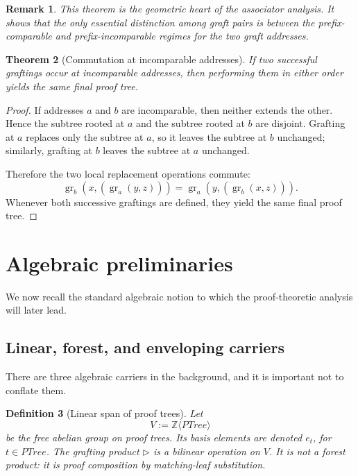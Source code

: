 \documentclass[11pt]{article}
\newtheorem{theorem}{Theorem}
\newtheorem{definition}[theorem]{Definition}
\newtheorem{remark}[theorem]{Remark}
\newcommand{\PTree}{\mathit{PTree}}
\newcommand{\ZZ}{\mathbb{Z}}
\newcommand{\graftat}[3]{\operatorname{gr}_{#2}(#3,#1)}
\begin{document}
\begin{remark}
This theorem is the geometric heart of the associator analysis. It shows that
the only essential distinction among graft pairs is between the
prefix-comparable and prefix-incomparable regimes for the two graft addresses.
\end{remark}

\begin{theorem}[Commutation at incomparable addresses]
If two successful graftings occur at incomparable addresses, then performing
them in either order yields the same final proof tree.
\end{theorem}

\begin{proof}
If addresses \(a\) and \(b\) are incomparable, then neither extends the
other. Hence the subtree rooted at \(a\) and the subtree rooted at \(b\) are
disjoint. Grafting at \(a\) replaces only the subtree at \(a\), so it leaves
the subtree at \(b\) unchanged; similarly, grafting at \(b\) leaves the
subtree at \(a\) unchanged.

Therefore the two local replacement operations commute:
\[
\graftat{(\graftat{z}{a}{y})}{b}{x}
=
\graftat{(\graftat{z}{b}{x})}{a}{y}.
\]
Whenever both successive graftings are defined, they yield the same final proof
tree.
\end{proof}



\section{Algebraic preliminaries}

We now recall the standard algebraic notion to which the proof-theoretic
analysis will later lead.

\subsection{Linear, forest, and enveloping carriers}

There are three algebraic carriers in the background, and it is important not
to conflate them.

\begin{definition}[Linear span of proof trees]
Let
\[
V:=\ZZ\langle\PTree\rangle
\]
be the free abelian group on proof trees. Its basis elements are denoted
\(e_t\), for \(t\in\PTree\). The grafting product
\(\triangleright\) is a bilinear operation on \(V\). It is not a forest
product: it is proof composition by matching-leaf substitution.
\end{definition}
\end{document}

